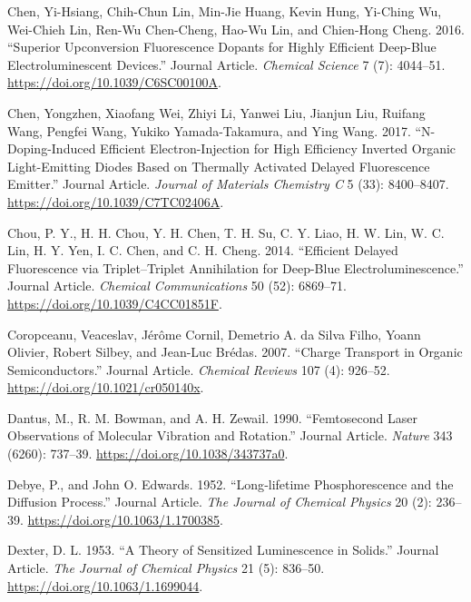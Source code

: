 \documentclass[
  letterpaper,
  DIV=11,
  numbers=noendperiod,
  oneside]{scrreprt}
\newlength{\cslhangindent}
\newlength{\cslentryspacingunit} %
\newenvironment{CSLReferences}[2] %
 {%
  \setlength{\parindent}{0pt}
  \ifodd #1
  \let\oldpar\par
  \def\par{\hangindent=\cslhangindent\oldpar}
  \fi
  \setlength{\parskip}{#2\cslentryspacingunit}
 }%
 {}
\begin{document}
\begin{CSLReferences}{1}{0}
\leavevmode{}%
Chen, Yi-Hsiang, Chih-Chun Lin, Min-Jie Huang, Kevin Hung, Yi-Ching Wu,
Wei-Chieh Lin, Ren-Wu Chen-Cheng, Hao-Wu Lin, and Chien-Hong Cheng.
2016. {``Superior Upconversion Fluorescence Dopants for Highly Efficient
Deep-Blue Electroluminescent Devices.''} Journal Article. \emph{Chemical
Science} 7 (7): 4044--51. \url{https://doi.org/10.1039/C6SC00100A}.

\leavevmode{}%
Chen, Yongzhen, Xiaofang Wei, Zhiyi Li, Yanwei Liu, Jianjun Liu, Ruifang
Wang, Pengfei Wang, Yukiko Yamada-Takamura, and Ying Wang. 2017.
{``N-Doping-Induced Efficient Electron-Injection for High Efficiency
Inverted Organic Light-Emitting Diodes Based on Thermally Activated
Delayed Fluorescence Emitter.''} Journal Article. \emph{Journal of
Materials Chemistry C} 5 (33): 8400--8407.
\url{https://doi.org/10.1039/C7TC02406A}.

\leavevmode{}%
Chou, P. Y., H. H. Chou, Y. H. Chen, T. H. Su, C. Y. Liao, H. W. Lin, W.
C. Lin, H. Y. Yen, I. C. Chen, and C. H. Cheng. 2014. {``Efficient
Delayed Fluorescence via Triplet--Triplet Annihilation for Deep-Blue
Electroluminescence.''} Journal Article. \emph{Chemical Communications}
50 (52): 6869--71. \url{https://doi.org/10.1039/C4CC01851F}.

\leavevmode{}%
Coropceanu, Veaceslav, Jérôme Cornil, Demetrio A. da Silva Filho, Yoann
Olivier, Robert Silbey, and Jean-Luc Brédas. 2007. {``Charge Transport
in Organic Semiconductors.''} Journal Article. \emph{Chemical Reviews}
107 (4): 926--52. \url{https://doi.org/10.1021/cr050140x}.

\leavevmode{}%
Dantus, M., R. M. Bowman, and A. H. Zewail. 1990. {``Femtosecond Laser
Observations of Molecular Vibration and Rotation.''} Journal Article.
\emph{Nature} 343 (6260): 737--39.
\url{https://doi.org/10.1038/343737a0}.

\leavevmode{}%
Debye, P., and John O. Edwards. 1952. {``Long‐lifetime Phosphorescence
and the Diffusion Process.''} Journal Article. \emph{The Journal of
Chemical Physics} 20 (2): 236--39.
\url{https://doi.org/10.1063/1.1700385}.

\leavevmode{}%
Dexter, D. L. 1953. {``A Theory of Sensitized Luminescence in Solids.''}
Journal Article. \emph{The Journal of Chemical Physics} 21 (5): 836--50.
\url{https://doi.org/10.1063/1.1699044}.


\end{CSLReferences}
\end{document}
